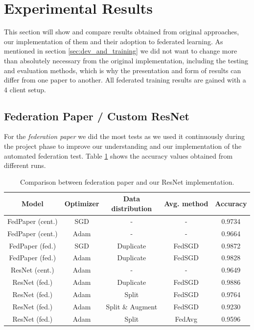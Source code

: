 \section{Experimental Results}
This section will show and compare results obtained from original approaches, our implementation of them and their adoption to federated learning. As mentioned in section \ref{sec:dev_and_training} we did not want to change more than absolutely necessary from the original implementation, including the testing and evaluation methods, which is why the presentation and form of results can differ from one paper to another. All federated training results are gained with a 4 client setup.


\subsection{Federation Paper / Custom ResNet}\label{subsec:results_federation_paper}
For the \textit{federation paper} we did the most tests as we used it continuously during the project phase to improve our understanding and our implementation of the automated federation test. Table \ref{tab:results_federation_paper} shows the accuracy values obtained from different runs.

\begin{table}[htbp]
    \small
    \centering
    \caption{Comparison between federation paper\cite{federated_machine_learning} and our ResNet implementation.}
    \begin{tabular}{c|c|c|c|c}
        Model & Optimizer & \shortstack[c]{Data\\distribution} & Avg. method & Accuracy\\
        \hline
        FedPaper (cent.) & SGD & - & - & 0.9734 \\
        FedPaper (cent.) & Adam & - & - & 0.9664 \\
        FedPaper (fed.) & SGD & Duplicate & FedSGD & 0.9872\\
        FedPaper (fed.) & Adam & Duplicate & FedSGD & 0.9828\\
        ResNet (cent.) & Adam & - & - & 0.9649 \\
        ResNet (fed.) & Adam & Duplicate & FedSGD & 0.9886 \\
        ResNet (fed.) & Adam & Split & FedSGD & 0.9764 \\
        ResNet (fed.) & Adam & Split \& Augment & FedSGD & 0.9230 \\
        ResNet (fed.) & Adam & Split & FedAvg & 0.9596 \\
    \end{tabular}
    \label{tab:results_federation_paper}
\end{table}

